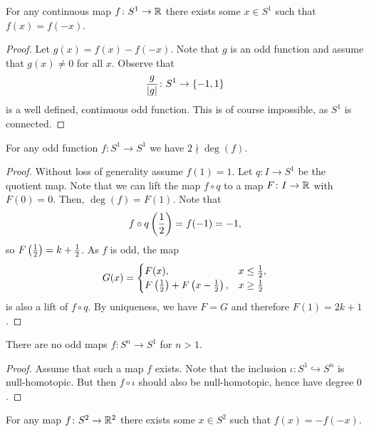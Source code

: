 \begin{izrek}
For any continuous map $f \colon S^1 \to \mathbb{R}$ there exists some
$x \in S^1$ such that $f(x) = f(-x)$.
\end{izrek}

\begin{proof}
Let $g(x) = f(x) - f(-x)$. Note that $g$ is an odd function and
assume that $g(x) \ne 0$ for all $x$. Observe that
\[
\frac{g}{\left\lvert g\right\rvert} \colon S^1 \to \left\{-1, 1\right\}
\]
is a well defined, continuous odd function. This is of course
impossible, as $S^1$ is connected.
\end{proof}


\begin{lema}
For any odd function $f \colon S^1 \to S^1$ we have
$2 \nmid \deg(f)$.
\end{lema}

\begin{proof}
Without loss of generality assume $f(1) = 1$. Let
$q \colon I \to S^1$ be the quotient map. Note that we can lift the
map $f \circ q$ to a map $F \colon I \to \mathbb{R}$ with $F(0) = 0$. Then,
$\deg(f) = F(1)$. Note that
\[
f \circ q \left(\frac{1}{2}\right) = f(-1) = -1,
\]
so $F \left(\frac{1}{2}\right) = k + \frac{1}{2}$. As $f$ is odd, the map
\[
G(x) =
\begin{cases}
F(x), & x \leq \frac{1}{2}, \\
F \left(\frac{1}{2}\right) + F \left(x - \frac{1}{2}\right), & x \geq \frac{1}{2}
\end{cases}
\]
is also a lift of $f \circ q$. By uniqueness, we have $F = G$ and
therefore $F(1) = 2k+1$.
\end{proof}

\begin{posledica}
There are no odd maps $f \colon S^n \to S^1$ for $n > 1$.
\end{posledica}

\begin{proof}
Assume that such a map $f$ exists. Note that the inclusion
$\iota \colon S^1 \hookrightarrow S^n$ is null-homotopic. But then
$f \circ \iota$ should also be null-homotopic, hence have degree
$0$.
\end{proof}

\begin{izrek}
For any map $f \colon S^2 \to \mathbb{R}^2$ there exists some $x \in S^2$
such that $f(x) = - f(-x)$.
\end{izrek}

